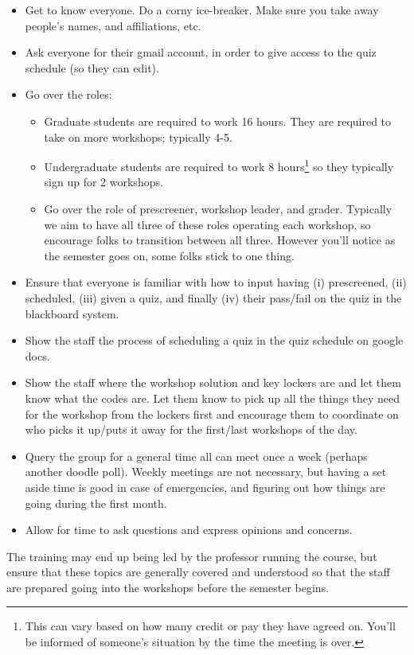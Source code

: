 \documentclass[12pt]{article}
\begin{document}
\begin{itemize}
	\item Get to know everyone. Do a corny ice-breaker. Make sure you take away people's names, and affiliations, etc.
	\item Ask everyone for their gmail account, in order to give access to the quiz schedule (so they can edit).
	\item Go over the roles:
		\begin{itemize}
			\item Graduate students are required to work 16 hours. They are required to take on more workshops; typically 4-5.
			\item Undergraduate students are required to work 8 hours\footnote{This can vary based on how many credit or pay they have agreed on. You'll be informed of someone's situation by the time the meeting is over.} so they typically sign up for 2 workshops.
			\item Go over the role of prescreener, workshop leader, and grader. Typically we aim to have all three of these roles operating each workshop, so encourage folks to transition between all three. However you'll notice as the semester goes on, some folks stick to one thing.
		\end{itemize}
	\item Ensure that everyone is familiar with how to input having (i) prescreened, (ii) scheduled, (iii) given a quiz, and finally (iv) their pass/fail on the quiz in the blackboard system.
	\item Show the staff the process of scheduling a quiz in the quiz schedule on google docs.
	\item Show the staff where the workshop solution and key lockers are and let them know what the codes are. Let them know to pick up all the things they need for the workshop from the lockers first and encourage them to coordinate on who picks it up/puts it away for the first/last workshops of the day.
	\item Query the group for a general time all can meet once a week (perhaps another doodle poll). Weekly meetings are not necessary, but having a set aside time is good in case of emergencies, and figuring out how things are going during the first month.
	\item Allow for time to ask questions and express opinions and concerns.
\end{itemize}

\indent The training may end up being led by the professor running the course, but ensure that these topics are generally covered and understood so that the staff are prepared going into the workshops before the semester begins. 
\end{document}
